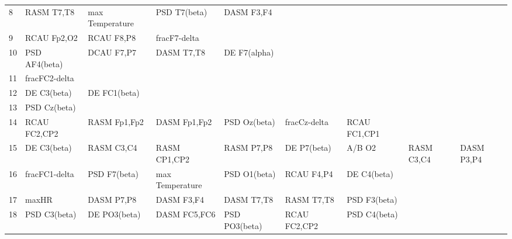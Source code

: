 \begin{landscape}
\begin{table}[]
\begin{tabular}{l|llllllll}
8                  & RASM T7,T8           & max Temperature         & PSD T7(beta)         & DASM F3,F4         &                       &                      &                 &                 \\
9                  & RCAU Fp2,O2          & RCAU F8,P8              & fracF7-delta         &                    &                       &                      &                 &                 \\
10                 & PSD AF4(beta)        & DCAU F7,P7              & DASM T7,T8           & DE F7(alpha)       &                       &                      &                 &                 \\
11                 & fracFC2-delta        &                         &                      &                    &                       &                      &                 &                 \\
12                 & DE C3(beta)          & DE FC1(beta)            &                      &                    &                       &                      &                 &                 \\
13                 & PSD Cz(beta)         &                         &                      &                    &                       &                      &                 &                 \\
14                 & RCAU FC2,CP2         & RASM Fp1,Fp2            & DASM Fp1,Fp2         & PSD Oz(beta)       & fracCz-delta          & RCAU FC1,CP1         &                 &                 \\
15                 & DE C3(beta)          & RASM C3,C4              & RASM CP1,CP2         & RASM P7,P8         & DE P7(beta)           & A/B O2               & RASM C3,C4      & DASM P3,P4      \\
16                 & fracFC1-delta        & PSD F7(beta)            & max Temperature      & PSD O1(beta)       & RCAU F4,P4            & DE C4(beta)          &                 &                 \\
17                 & maxHR                & DASM P7,P8              & DASM F3,F4           & DASM T7,T8         & RASM T7,T8            & PSD F3(beta)         &                 &                 \\
18                 & PSD C3(beta)         & DE PO3(beta)            & DASM FC5,FC6         & PSD PO3(beta)      & RCAU FC2,CP2          & PSD C4(beta)         &                 &                 \\

\end{tabular}
\end{table}
\end{landscape}
